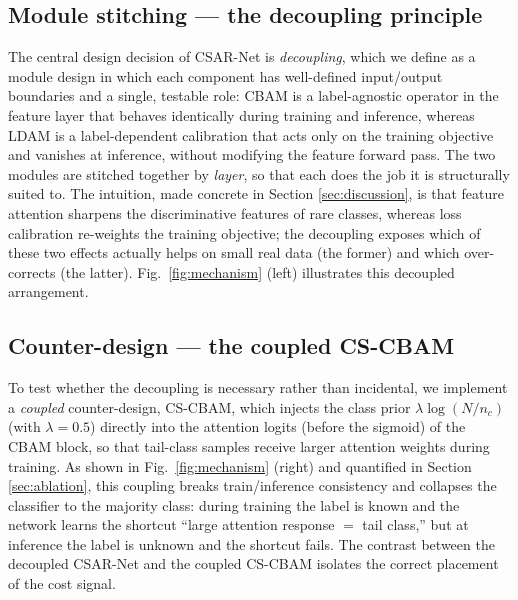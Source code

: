 \documentclass[a4paper,fleqn]{cas-sc}
\begin{document}
\begin{sloppypar}
	\subsection{Module stitching --- the decoupling principle}
	\label{sec:stitching}
	\par{
		The central design decision of CSAR-Net is \emph{decoupling}, which we define as a module design in which each component has well-defined input/output boundaries and a single, testable role: CBAM is a label-agnostic operator in the feature layer that behaves identically during training and inference, whereas LDAM is a label-dependent calibration that acts only on the training objective and vanishes at inference, without modifying the feature forward pass. The two modules are stitched together by \emph{layer}, so that each does the job it is structurally suited to. The intuition, made concrete in Section \ref{sec:discussion}, is that feature attention sharpens the discriminative features of rare classes, whereas loss calibration re-weights the training objective; the decoupling exposes which of these two effects actually helps on small real data (the former) and which over-corrects (the latter). Fig.~\ref{fig:mechanism} (left) illustrates this decoupled arrangement.
	}

	\subsection{Counter-design --- the coupled CS-CBAM}
	\label{sec:cscbam}
	\par{
		To test whether the decoupling is necessary rather than incidental, we implement a \emph{coupled} counter-design, CS-CBAM, which injects the class prior $\lambda\log(N/n_c)$ (with $\lambda=0.5$) directly into the attention logits (before the sigmoid) of the CBAM block, so that tail-class samples receive larger attention weights during training. As shown in Fig.~\ref{fig:mechanism} (right) and quantified in Section \ref{sec:ablation}, this coupling breaks train/inference consistency and collapses the classifier to the majority class: during training the label is known and the network learns the shortcut ``large attention response $=$ tail class,'' but at inference the label is unknown and the shortcut fails. The contrast between the decoupled CSAR-Net and the coupled CS-CBAM isolates the correct placement of the cost signal.
	}


\end{sloppypar}
\end{document}
